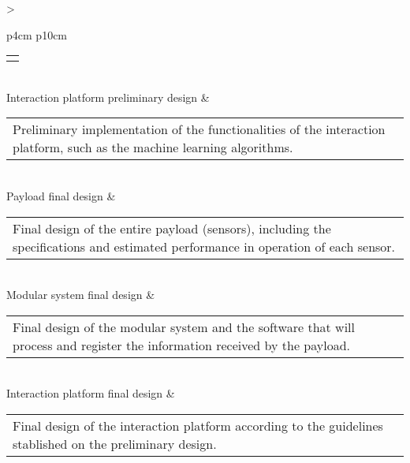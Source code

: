 \begin{longtable}[H]{>{\raggedright\arraybackslash}p{4cm} p{10cm}}
\begin{tabular}[c]{@{}l@{}}
\begin{minipage}[t]{\linewidth}
	\end{minipage} \end{tabular}                                                                                                                                             \\ \midrule                                                                                                                                  
	Interaction platform preliminary design & \begin{tabular}[c]{@{}l@{}}\begin{minipage}[t]{\linewidth}
			Preliminary implementation of the functionalities of the interaction platform, such as the machine learning algorithms.  \vspace{0.3cm}
	\end{minipage} \end{tabular}                                                                                                                    \\ \midrule
	Payload final design & \begin{tabular}[c]{@{}l@{}}\begin{minipage}[t]{\linewidth}
			Final design of the entire payload (sensors), including the specifications and estimated performance in operation of each sensor.  \vspace{0.3cm}
	\end{minipage} \end{tabular}                                                                                                                     \\ \midrule
	Modular system final design & \begin{tabular}[c]{@{}l@{}}\begin{minipage}[t]{\linewidth}
			Final design of the modular system and the software that will process and register the information received by the payload. \vspace{0.3cm}
	\end{minipage} \end{tabular}                                                                                                                    \\ \midrule
	Interaction platform final design & \begin{tabular}[c]{@{}l@{}}\begin{minipage}[t]{\linewidth}
			Final design of the interaction platform according to the guidelines stablished on the preliminary design. \vspace{0.3cm}

\end{minipage}
\end{tabular}
\end{longtable}
